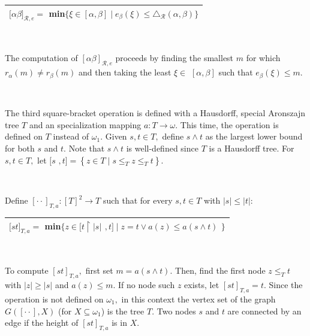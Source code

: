 \documentclass{article}
\begin{document}
\begin{center}%
\begin{tabular}
[c]{|l|}\hline
$\lbrack\alpha\beta]_{\mathcal{R},e}=$ \textsf{min}$\{\mathsf{\xi}\in\left[
\alpha,\beta\right]  \mid e_{\beta}\left(  \xi\right)  \leq\triangle
_{\mathcal{R}}\left(  \alpha,\beta\right)  \}$\\\hline
\end{tabular}


\qquad\ \qquad\ \ \ 
\end{center}

The computation of $[\alpha\beta]_{\mathcal{R},e}$ proceeds by finding the
smallest $m$ for which $r_{\alpha}\left(  m\right)  \neq r_{\beta}\left(
m\right)  $ and then taking the least $\xi\in$ $\left[  \alpha,\beta\right]  $
such that $e_{\beta}\left(  \xi\right)  \leq m.$

\qquad\qquad\ \ \qquad\ \ \ \ \ 

The third square-bracket operation is defined with a Hausdorff, special
Aronszajn tree $T$ and an specialization mapping $a:T\longrightarrow\omega.$
This time, the operation is defined on $T$ instead of $\omega_{1}.$ Given
$s,t\in T,$ define $s\wedge t$ as the largest lower bound for both $s$ and
$t.$ Note that $s\wedge t$ is well-defined since $T$ is a Hausdorff tree. For
$s,t\in T,$ let $[s$ $,t]=\left\{  z\in T\mid s\leq_{T}z\leq_{T}t\right\}  .$

\qquad\ \qquad\ \qquad\ \ \ \ \ \ 

Define $[\cdot\cdot]_{T,a}:\left[  T\right]  ^{2}\longrightarrow T$ such that
for every $s,t\in T$ with $\left\vert s\right\vert \leq\left\vert t\right\vert
$:

\begin{center}%
\begin{tabular}
[c]{|l|}\hline
$\lbrack st]_{T,a}=$ \textsf{min}$\{z\in\lbrack t\upharpoonright\left\vert
s\right\vert $ $,t]\mid z=t\vee a\left(  z\right)  \leq a\left(  s\wedge
t\right)  $ $\}$\\\hline
\end{tabular}


\qquad\ \qquad\ \ 
\end{center}

To compute $[st]_{T,a},$ first set $m=a\left(  s\wedge t\right)  .$ Then, find
the first node $z\leq_{T}t$ with $\left\vert z\right\vert \geq\left\vert
s\right\vert $ and $a\left(  z\right)  \leq m.$ If no node such $z$ exists,
let $[st]_{T,a}=t.$ Since the operation is not defined on $\omega_{1},$ in
this context the vertex set of the graph $G([\cdot\cdot],X)$ (for
$X\subseteq\omega_{1}$) is the tree $T.$ Two nodes $s$ and $t$ are connected
by an edge if the height of $[st]_{T,a}$ is in $X.$
\end{document}
